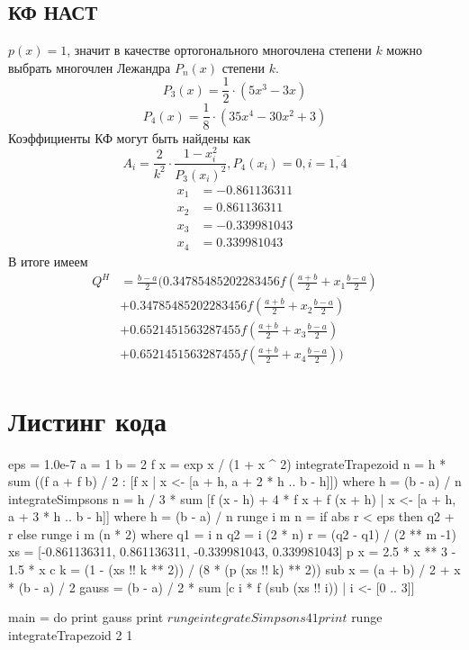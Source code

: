 \documentclass{article}
\begin{document}
\subsection*{КФ НАСТ}
$p(x) = 1$, значит в качестве ортогонального многочлена степени $k$ 
можно выбрать многочлен Лежандра $P_n(x)$ степени $k$.
\[P_3(x) = \frac{1}{2}\cdot \left(5x^3 - 3x\right)  \]
\[P_4(x) = \frac{1}{8}\cdot \left(35x^4 - 30x^2 + 3\right)  \]
Коэффициенты КФ могут быть найдены как
\[A_i = \frac{2}{k^2} \cdot \frac{1-x_i ^ 2}{P_3(x_i) ^ 2}, P_4(x_i) = 0, i = \overline{1, 4}\]
\begin{equation*}
    \begin{split}
        x_1 &= -0.861136311\\
        x_2 &= 0.861136311\\
        x_3 &= -0.339981043 \\
        x_4 &= 0.339981043
    \end{split}
\end{equation*}
В итоге имеем
\begin{equation*}
   \begin{split}
Q^H &=  \frac{b-a}{2}  ( 0.34785485202283456 f(\frac{a + b}{2} + x_1  \frac{b - a}{2}) \\
&+ 0.34785485202283456 f(\frac{a + b}{2} + x_2 \frac{b - a}{2})  \\
&+ 0.6521451563287455 f(\frac{a + b}{2} + x_3  \frac{b - a}{2}) \\
&+ 0.6521451563287455 f(\frac{a + b}{2} + x_4  \frac{b - a}{2}) )
   \end{split} 
\end{equation*}

\section*{Листинг кода}
\begin{python}
eps = 1.0e-7
a = 1
b = 2
f x = exp x / (1 + x ^ 2)
integrateTrapezoid n = h * sum ((f a + f b) / 2 : [f x | x <- [a + h, a + 2 * h .. b - h]]) where h = (b - a) / n
integrateSimpsons n = h / 3 * sum [f (x - h) + 4 * f x + f (x + h) | x <- [a + h, a + 3 * h .. b - h]] where h = (b - a) / n
runge i m n = if abs r < eps then q2 + r else runge i m (n * 2)
  where q1 = i n
        q2 = i (2 * n)
        r = (q2 - q1) / (2 ** m -1)
xs = [-0.861136311, 0.861136311, -0.339981043, 0.339981043]
p x = 2.5 * x ** 3 - 1.5 * x
c k = (1 - (xs !! k ** 2)) / (8 * (p (xs !! k) ** 2))
sub x = (a + b) / 2 + x * (b - a) / 2
gauss = (b - a) / 2 * sum [c i * f (sub (xs !! i)) | i <- [0 .. 3]]

main = do
  print gauss
  print $ runge integrateSimpsons  4 1
  print $ runge integrateTrapezoid 2 1
\end{python}
\end{document}
